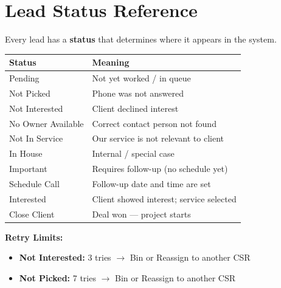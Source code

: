 \documentclass[11pt,a4paper]{article}
\begin{document}

\section{Lead Status Reference}

Every lead has a \textbf{status} that determines where it appears in the system.

\begin{longtable}{@{}p{4cm}p{10cm}@{}}
\toprule
\textbf{Status} & \textbf{Meaning} \\
\midrule
\endhead
Pending             & Not yet worked / in queue \\
Not Picked          & Phone was not answered \\
Not Interested      & Client declined interest \\
No Owner Available  & Correct contact person not found \\
Not In Service      & Our service is not relevant to client \\
In House            & Internal / special case \\
Important           & Requires follow-up (no schedule yet) \\
Schedule Call       & Follow-up date and time are set \\
Interested          & Client showed interest; service selected \\
Close Client        & Deal won --- project starts \\
\bottomrule
\end{longtable}

\begin{warningbox}
\textbf{Retry Limits:}
\begin{itemize}[noitemsep]
    \item \textbf{Not Interested:} 3 tries $\rightarrow$ Bin or Reassign to another CSR
    \item \textbf{Not Picked:} 7 tries $\rightarrow$ Bin or Reassign to another CSR
\end{itemize}
\end{warningbox}

\end{document}
